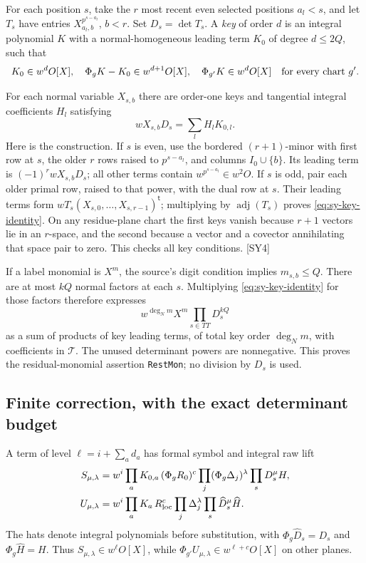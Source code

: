 For each position $s$, take the $r$ most recent even selected positions $a_l<s$, and let $T_s$ have entries $X_{a_l,b}^{p^{s-a_l}}$, $b<r$. Set $D_s=\det T_s$. A \emph{key} of order $d$ is an integral polynomial $K$ with a normal-homogeneous leading term $K_0$ of degree $d\le2Q$, such that
\[
K_0\in w^dO[X],\quad \Phi_gK-K_0\in w^{d+1}O[X],\quad
\Phi_{g'}K\in w^dO[X]\quad\hbox{for every chart }g'.
\]

For each normal variable $X_{s,b}$ there are order-one keys and tangential integral coefficients $H_l$ satisfying
\begin{equation}\label{eq:sy-key-identity}
wX_{s,b}D_s=\sum_lH_lK_{0,l}.
\end{equation}
Here is the construction. If $s$ is even, use the bordered $(r+1)$-minor with first row at $s$, the older $r$ rows raised to $p^{s-a_l}$, and columns $I_0\cup\{b\}$. Its leading term is $(-1)^rwX_{s,b}D_s$; all other terms contain $w^{p^{s-a_l}}\in w^2O$. If $s$ is odd, pair each older primal row, raised to that power, with the dual row at $s$. Their leading terms form $wT_s(X_{s,0},\ldots,X_{s,r-1})^{\mathsf t}$; multiplying by $\operatorname{adj}(T_s)$ proves \eqref{eq:sy-key-identity}. On any residue-plane chart the first keys vanish because $r+1$ vectors lie in an $r$-space, and the second because a vector and a covector annihilating that space pair to zero. This checks all key conditions. \textsf{[SY4]}

If a label monomial is $X^m$, the source's digit condition implies $m_{s,b}\le Q$. There are at most $kQ$ normal factors at each $s$. Multiplying \eqref{eq:sy-key-identity} for those factors therefore expresses
\[
w^{\deg_N m}X^m\prod_{s\in TT}D_s^{kQ}
\]
as a sum of products of key leading terms, of total key order $\deg_Nm$, with coefficients in $\mathcal T$. The unused determinant powers are nonnegative. This proves the residual-monomial assertion \texttt{RestMon}; no division by $D_s$ is used.

\subsection{Finite correction, with the exact determinant budget}

A term of level $\ell=i+\sum_a d_a$ has formal symbol and integral raw lift
\begin{align*}
S_{\mu,\lambda}&=w^i\prod_aK_{0,a}\,(\Phi_gR_0)^c
            \prod_j(\Phi_g\Delta_j)^\lambda\prod_sD_s^\mu H,\\
U_{\mu,\lambda}&=w^i\prod_aK_a\,R_{\rm loc}^c
            \prod_j\Delta_j^\lambda\prod_s\widehat D_s^\mu\widehat H.
\end{align*}
The hats denote integral polynomials before substitution, with $\Phi_g\widehat D_s=D_s$ and $\Phi_g\widehat H=H$. Thus $S_{\mu,\lambda}\in w^\ell O[X]$, while $\Phi_{g'}U_{\mu,\lambda}\in w^{\ell+c}O[X]$ on other planes.

